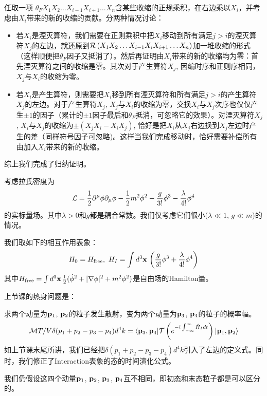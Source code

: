 \documentclass[CJK]{beamer}
\begin{document}
\begin{frame}
\bch
{\small
任取一项 $\theta_F X_1X_2\ldots X_{i-1}X_{i+1}\ldots X_n$含某些收缩的正规乘积，在右边乘以$X_i$，并考虑由$X_i$带来的新的收缩的贡献。分两种情况讨论：
\begin{itemize}
\item{若$X_i$是湮灭算符，我们需要在正则乘积中把$X_i$移动到所有满足$j>i$的湮灭算符$X_j$的左边，就还原到$\mathcal{R}\left(X_1X_2\ldots X_{i-1}X_iX_{i+1}\ldots X_n\right)$加一堆收缩的形式（这样顺便把$\theta_F$因子又抵消了）。然后再证明由$X_i$带来的新的收缩均为零：首先湮灭算符之间的收缩是零。其次对于产生算符$X_j$, 因编时序和正则序相同，$X_j$与$X_i$的收缩为零。}
\item{若$X_i$是产生算符，则需要把$X_i$移到所有湮灭算符和所有满足$j>i$的产生算符$X_j$的左边。对于产生算符$X_j$, $X_j$与$X_i$的收缩为零，交换$X_i$与$X_j$次序也仅仅产生$\pm 1$的因子（累计的$\pm 1$因子最后和$\theta_F$抵消，可忽略它的效果）。对湮灭算符$X_j$, $X_i$与$X_j$的收缩为$\pm(X_jX_i - X_iX_j)$, 恰好是把$X_i$从$X_j$右边换到$X_j$左边时产生的差（同样符号因子可忽略)。这样当我们完成移动时，恰好需要补偿所有由加入$X_i$带来的新的收缩。}
\end{itemize}
综上我们完成了归纳证明。
}
\ech
\end{frame}


\begin{frame} 
\bch
考虑拉氏密度为
$${\mathcal{L}} = \frac{1}{2}\partial^\mu\phi\partial_\mu\phi - \frac{1}{2}m^2\phi^2 - \frac{g}{3!}\phi^3- \frac{\lambda}{4!}\phi^4$$
的实标量场。其中$\lambda>0$和$g$都是耦合常数。我们仅考虑它们很小($\lambda \ll 1$, $g\ll m$)的情况。

我们取如下的相互作用表象：
$$ H_0 = H_{\rm free},\ H_I = \int d^3{\mathbf{x}}\, \left(\frac{g}{3!}\phi^3 + \frac{\lambda}{4!} \phi^4\right)$$
其中$H_{\rm free} = \int d^3{\mathbf{x}}\, \frac{1}{2}(\dot\phi^2 + |\nabla \phi|^2 + m^2\phi^2)$是自由场的Hamilton量。

\ech
\end{frame}




\begin{frame} 
\bch
上节课的热身问题是：
\skipline

求两个动量为${\mathbf{p}}_1$, ${\mathbf{p}}_2$的粒子发生散射，变为两个动量为${\mathbf{p}}_3$, ${\mathbf{p}}_4$的粒子的概率幅。
$${\mathcal{M}} T/V \delta(p_1+p_2-p_3-p_4)d^4k= \langle {\mathbf{p}}_3, {\mathbf{p}}_4| \mathcal{T}\left( e^{-{\dot{\imath}}\int_{-\infty}^\infty \hat{H}_I dt}\right)|{\mathbf{p}}_1,{\mathbf{p}}_2\rangle$$
如上节课末尾所讲，我们已经把$\delta(p_1+p_2-p_3-p_4)d^4k$引入了左边的定义式。同时，我们修正了Interaction表象的态的时间演化公式。
\skipline

我们仍假设这四个动量${\mathbf{p}}_1$, ${\mathbf{p}}_2$, ${\mathbf{p}}_3$, ${\mathbf{p}}_4$互不相同，即初态和末态粒子都是可以区分的。
\ech
\end{frame}
\end{document}
